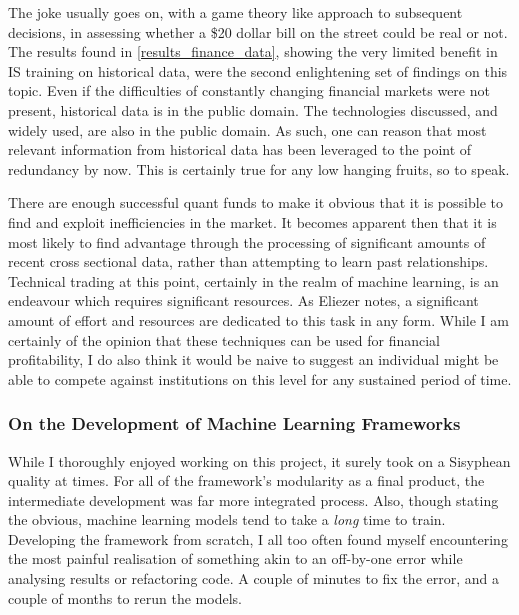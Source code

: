 \documentclass[a4paper,11pt,oneside]{article}
\theoremstyle{plain}
\theoremstyle{definition}
\begin{document}
	The joke usually goes on, with a game theory like approach to subsequent decisions, in assessing whether a \$20 dollar bill on the street could be real or not. The results found in \ref{results_finance_data}, showing the very limited benefit in IS training on historical data, were the second enlightening set of findings on this topic. Even if the difficulties of constantly changing financial markets were not present, historical data is in the public domain. The technologies discussed, and widely used, are also in the public domain. As such, one can reason that most relevant information from historical data has been leveraged to the point of redundancy by now. This is certainly true for any low hanging fruits, so to speak. \newline
	
	There are enough successful quant funds to make it obvious that it is possible to find and exploit inefficiencies in the market. It becomes apparent then that it is most likely to find advantage through the processing of significant amounts of recent cross sectional data, rather than attempting to learn past relationships. Technical trading at this point, certainly in the realm of machine learning, is an endeavour which requires significant resources. As Eliezer notes, a significant amount of effort and resources are dedicated to this task in any form. While I am certainly of the opinion that these techniques can be used for financial profitability, I do also think it would be naive to suggest an individual might be able to compete against institutions on this level for any sustained period of time.
	
	\subsubsection{On the Development of Machine Learning Frameworks}

	While I thoroughly enjoyed working on this project, it surely took on a Sisyphean quality at times. For all of the framework's modularity as a final product, the intermediate development was far more integrated process. Also, though stating the obvious, machine learning models tend to take a \textit{long} time to train. Developing the framework from scratch, I all too often found myself encountering the most painful realisation of something akin to an off-by-one error while analysing results or refactoring code. A couple of minutes to fix the error, and a couple of months to rerun the models.\newline
	
\end{document}
